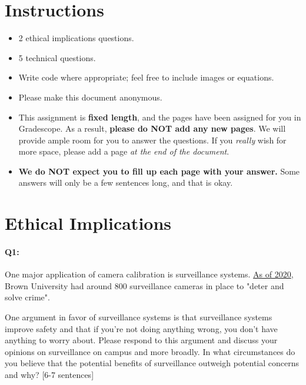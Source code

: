 \maketitle
\vspace{-2cm}
\thispagestyle{fancy}

\section*{Instructions}
\begin{itemize}
  \item 2 ethical implications questions.
  \item 5 technical questions.
  \item Write code where appropriate; feel free to include images or equations.
  \item Please make this document anonymous.
  \item This assignment is \textbf{fixed length}, and the pages have been assigned for you in Gradescope. As a result, \textbf{please do NOT add any new pages}. We will provide ample room for you to answer the questions. If you \emph{really} wish for more space, please add a page \emph{at the end of the document}.
  \item \textbf{We do NOT expect you to fill up each page with your answer.} Some answers will only be a few sentences long, and that is okay.
\end{itemize}



\pagebreak 
\section*{Ethical Implications}
\paragraph{Q1:} One major application of camera calibration is surveillance systems. \href{https://www.browndailyherald.com/article/2020/02/cameras-installed-in-hegeman-hall}{As of 2020}, Brown University had around 800 surveillance cameras in place to "deter and solve crime". 

One argument in favor of surveillance systems is that surveillance systems improve safety and that if you're not doing anything wrong, you don't have anything to worry about. Please respond to this argument and discuss your opinions on surveillance on campus and more broadly. In what circumstances do you believe that the potential benefits of surveillance outweigh potential concerns and why? [6-7 sentences]


